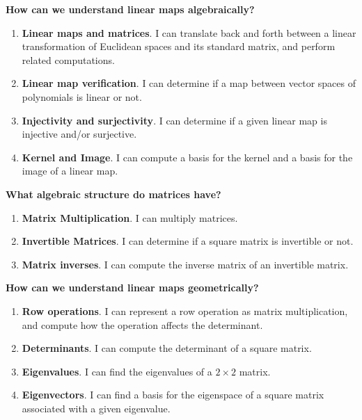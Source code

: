 \noindent\textbf{How can we understand linear maps algebraically?}
\begin{enumerate}
\setlength{\itemsep}{-0.02in}
\item {\bf Linear maps and matrices}. I can translate back and forth between a
linear transformation of Euclidean spaces and its standard matrix, and perform related computations.
\item {\bf Linear map verification}. I can determine if a map between vector spaces of polynomials is linear or not.
\item {\bf Injectivity and surjectivity}.  I can determine if a given linear map is injective and/or surjective.
\item {\bf Kernel and Image}. I can compute a basis for the kernel and a basis for the image of a linear map.
\end{enumerate}


\noindent\textbf{What algebraic structure do matrices have?}
\begin{enumerate}
\setlength{\itemsep}{-0.02in}
\item {\bf Matrix Multiplication}. I can multiply matrices.
\item {\bf Invertible Matrices}. I can determine if a square matrix is invertible or not.
\item {\bf Matrix inverses}.  I can compute the inverse matrix of an invertible matrix.
\end{enumerate}


\noindent\textbf{How can we understand linear maps geometrically?}
\begin{enumerate}
\setlength{\itemsep}{-0.02in}
\item {\bf Row operations}.  I can represent a row operation as matrix multiplication, and compute how the operation affects the determinant.
\item {\bf Determinants}. I can compute the determinant of a square matrix.
\item {\bf Eigenvalues}. I can find the eigenvalues of a $2\times 2$ matrix.
\item {\bf Eigenvectors}. I can find a basis for the eigenspace of a square matrix associated with a given eigenvalue.
\end{enumerate}


